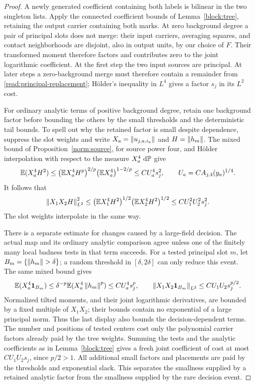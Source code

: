 \begin{proof}
A newly generated coefficient containing both labels is bilinear in
the two singleton lists.  Apply the connected coefficient bounds of
Lemma~\ref{block:tree}, retaining the output carrier containing
both marks.  At zero background degree a pair of principal slots does
not merge: their input carriers, averaging squares, and contact
neighborhoods are disjoint, also in output units, by our choice of $F$.
Their transformed moment therefore factors and contributes zero to
the joint logarithmic coefficient.  At the first step the two input
sources are principal.  At later steps a zero-background merge must
therefore contain a remainder from
\eqref{read:principal-replacement}; H\"older's inequality in $L^4$
gives a factor $s_j$ in its $L^2$ cost.

For ordinary analytic terms of positive background degree, retain one
background factor before bounding the others by the small thresholds
and the deterministic tail bounds.  To spell out why the retained
factor is small despite dependence, suppress the slot weights
and write $X_a=\left\lVert u_{j,a,i_a}\right\rVert$ and $H=\left\lVert h_m\right\rVert$.
The mixed bound of Proposition~\ref{norm:source}, for source power four,
and H\"older interpolation with respect to the measure $X_a^4\,\,\mathrm d\mathbb P$
give
\[
 \mathbb E(X_a^4H^2)
 \le \bigl(\mathbb E X_a^4H^p\bigr)^{2/p}
       \bigl(\mathbb E X_a^4\bigr)^{1-2/p}
 \le C U_a^4s_j^2,
 \qquad U_a=C A_{j,4}(y_a)^{1/4}.
\]
It follows that
\[
 \left\lVert X_1X_2H\right\rVert_{L^2}^2
 \le\bigl(\mathbb E X_1^4H^2\bigr)^{1/2}
      \bigl(\mathbb E X_2^4H^2\bigr)^{1/2}
 \le C U_1^2U_2^2s_j^2.
\]
The slot weights interpolate in the same way.

There is a separate estimate for changes caused by a large-field
decision.  The actual map and its ordinary analytic comparison agree
unless one of the finitely many local badness tests in that term
succeeds.  For a tested principal slot $m$, let
$B_m=\{\left\lVert h_m\right\rVert>\delta\}$; a random threshold in
$[\delta,2\delta]$ can only reduce this event.  The same mixed bound
gives
\[
 \mathbb E(X_a^4\mathbf 1_{B_m})
 \le\delta^{-p}\mathbb E(X_a^4\left\lVert h_m\right\rVert^p)
 \le C U_a^4s_j^p,
 \qquad
 \left\lVert X_1X_2\mathbf 1_{B_m}\right\rVert_{L^2}
 \le C U_1U_2s_j^{p/2}.
\]
Normalized tilted moments, and their joint logarithmic derivatives,
are bounded by a fixed multiple of $X_1X_2$; their bounds contain no
exponential of a large principal norm.  Thus the last display also
bounds the decision-dependent terms.  The number and positions of
tested centers cost only the polynomial carrier factors already paid
by the tree weights.  Summing the tests and the analytic coefficients
as in Lemma~\ref{block:tree} gives a fresh joint coefficient of
cost at most $C U_1U_2s_j$, since $p/2>1$.  All additional small
factors and placements are paid by the thresholds and exponential
slack.  This separates the smallness supplied by a retained analytic
factor from the smallness supplied by the rare decision event.


\end{proof}
